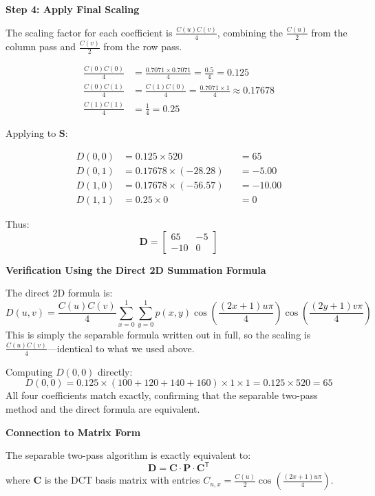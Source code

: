 \begin{examplebox}
\medskip
\noindent
\textbf{\large Step 4: Apply Final Scaling}

The scaling factor for each coefficient is $\frac{C(u)C(v)}{4}$, combining the
$\frac{C(u)}{2}$ from the column pass and $\frac{C(v)}{2}$ from the row pass.

\begin{align*}
\frac{C(0)C(0)}{4} &= \frac{0.7071 \times 0.7071}{4} = \frac{0.5}{4} = 0.125\\
\frac{C(0)C(1)}{4} &= \frac{C(1)C(0)}{4} = \frac{0.7071 \times 1}{4} \approx 0.17678\\
\frac{C(1)C(1)}{4} &= \frac{1}{4} = 0.25
\end{align*}

Applying to $\mathbf{S}$:

\begin{align*}
D(0,0) &= 0.125   \times 520   &&= 65 \\
D(0,1) &= 0.17678 \times (-28.28) &&= -5.00 \\
D(1,0) &= 0.17678 \times (-56.57) &&= -10.00 \\
D(1,1) &= 0.25    \times 0      &&= 0
\end{align*}

Thus:
\[
\boxed{\mathbf{D} = \begin{bmatrix}
65 & -5 \\
-10 & 0
\end{bmatrix}}
\]

\medskip
\noindent
\textbf{\large Verification Using the Direct 2D Summation Formula}

The direct 2D formula is:
\[
D(u,v) = \frac{C(u)C(v)}{4} \sum_{x=0}^{1}\sum_{y=0}^{1}
p(x,y)\cos\!\left(\frac{(2x+1)u\pi}{4}\right)\cos\!\left(\frac{(2y+1)v\pi}{4}\right)
\]
This is simply the separable formula written out in full, so the scaling is
$\frac{C(u)C(v)}{4}$---identical to what we used above.

Computing $D(0,0)$ directly:
\[
D(0,0) = 0.125 \times (100 + 120 + 140 + 160) \times 1 \times 1
        = 0.125 \times 520 = 65
\]
All four coefficients match exactly, confirming that the separable two-pass
method and the direct formula are equivalent.

\medskip
\noindent
\textbf{\large Connection to Matrix Form}

The separable two-pass algorithm is exactly equivalent to:
\[
\mathbf{D} = \mathbf{C} \cdot \mathbf{P} \cdot \mathbf{C}^{\mathsf{T}}
\]
where $\mathbf{C}$ is the DCT basis matrix with entries
$C_{u,x} = \frac{C(u)}{2}\cos\!\left(\frac{(2x+1)u\pi}{4}\right)$.


\end{examplebox}
